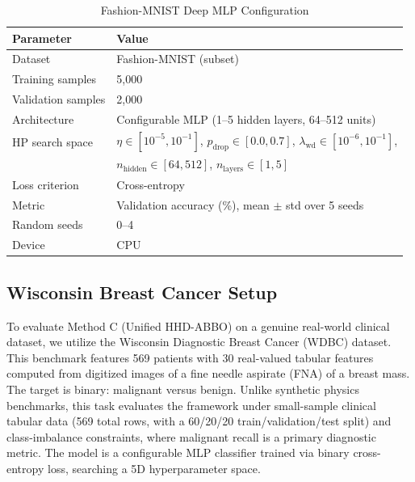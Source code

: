 \documentclass[11pt]{article}
\theoremstyle{definition}
\begin{document}
\begin{table}[H]
\centering
\caption{Fashion-MNIST Deep MLP Configuration}
\label{tab:fmnist_setup}
\renewcommand{\arraystretch}{1.2}
\begin{tabular}{ll}
\toprule
Parameter & Value \\
\midrule
Dataset              & Fashion-MNIST (subset) \\
Training samples     & 5,000 \\
Validation samples   & 2,000 \\
Architecture         & Configurable MLP (1--5 hidden layers, 64--512 units) \\
HP search space      & $\eta\in[10^{-5},10^{-1}]$,
                       $p_{\mathrm{drop}}\in[0.0,0.7]$,
                       $\lambda_{\mathrm{wd}}\in[10^{-6},10^{-1}]$, \\
                     & $n_{\mathrm{hidden}}\in[64,512]$,
                       $n_{\mathrm{layers}}\in[1,5]$ \\
Loss criterion       & Cross-entropy \\
Metric               & Validation accuracy (\%), mean $\pm$ std over 5 seeds \\
Random seeds         & 0--4 \\
Device               & CPU \\
\bottomrule
\end{tabular}
\end{table}

\subsection{Wisconsin Breast Cancer Setup}

To evaluate Method C (Unified HHD-ABBO) on a genuine real-world clinical dataset, we utilize the Wisconsin Diagnostic Breast Cancer (WDBC) dataset. This benchmark features 569 patients with 30 real-valued tabular features computed from digitized images of a fine needle aspirate (FNA) of a breast mass. The target is binary: malignant versus benign. Unlike synthetic physics benchmarks, this task evaluates the framework under small-sample clinical tabular data (569 total rows, with a 60/20/20 train/validation/test split) and class-imbalance constraints, where malignant recall is a primary diagnostic metric. The model is a configurable MLP classifier trained via binary cross-entropy loss, searching a 5D hyperparameter space.
\end{document}
